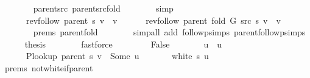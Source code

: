 \begin{isabellebody}
\ \ \ \ \ \ \isamarkupfalse%
\ parent{\isacharunderscore}{\kern0pt}src\ parent{\isacharunderscore}{\kern0pt}src{\isacharunderscore}{\kern0pt}fold\isanewline
\ \ \ \ \ \ \isamarkupfalse%
\ simp{\isacharplus}{\kern0pt}\isanewline
\ \ \ \ \isamarkupfalse%
\isanewline
\ \ \ \ \ \ {\isachardoublequoteopen}rev{\isacharunderscore}{\kern0pt}follow\ {\isacharparenleft}{\kern0pt}parent\ s{\isacharparenright}{\kern0pt}\ v\ {\isacharequal}{\kern0pt}\ {\isacharbrackleft}{\kern0pt}v{\isacharbrackright}{\kern0pt}{\isachardoublequoteclose}\isanewline
\ \ \ \ \ \ {\isachardoublequoteopen}rev{\isacharunderscore}{\kern0pt}follow\ {\isacharparenleft}{\kern0pt}parent\ {\isacharparenleft}{\kern0pt}fold\ G\ src\ s{\isacharparenright}{\kern0pt}{\isacharparenright}{\kern0pt}\ v\ {\isacharequal}{\kern0pt}\ {\isacharbrackleft}{\kern0pt}v{\isacharbrackright}{\kern0pt}{\isachardoublequoteclose}\isanewline
\ \ \ \ \ \ \isamarkupfalse%
\ {\isachardoublequoteopen}{}{\isachardot}{\kern0pt}prems{\isachardoublequoteclose}{\isacharparenleft}{\kern0pt}{}{\isacharparenright}{\kern0pt}\ parent{\isacharunderscore}{\kern0pt}fold\isanewline
\ \ \ \ \ \ \isamarkupfalse%
\ {\isacharparenleft}{\kern0pt}simp{\isacharunderscore}{\kern0pt}all\ add{\isacharcolon}{\kern0pt}\ follow{\isacharunderscore}{\kern0pt}psimps\ parent{\isachardot}{\kern0pt}follow{\isacharunderscore}{\kern0pt}psimps{\isacharparenright}{\kern0pt}\isanewline
\ \ \ \ \isamarkupfalse%
\ {\isacharquery}{\kern0pt}thesis\isanewline
\ \ \ \ \ \ \isamarkupfalse%
\ fastforce\isanewline
\ \ \isamarkupfalse%
\isanewline
\ \ \ \ \isamarkupfalse%
\ False\isanewline
\ \ \ \ \isamarkupfalse%
\ \isamarkupfalse%
\ u\ \ u{\isacharcolon}{\kern0pt}\isanewline
\ \ \ \ \ \ {\isachardoublequoteopen}P{\isacharunderscore}{\kern0pt}lookup\ {\isacharparenleft}{\kern0pt}parent\ s{\isacharparenright}{\kern0pt}\ v\ {\isacharequal}{\kern0pt}\ Some\ u{\isachardoublequoteclose}\isanewline
\ \ \ \ \ \ {\isachardoublequoteopen}{\isasymnot}\ white\ s\ u{\isachardoublequoteclose}\isanewline
\ \ \ \ \ \ \isamarkupfalse%
\ {\isachardoublequoteopen}{}{\isachardot}{\kern0pt}prems{\isachardoublequoteclose}{\isacharparenleft}{\kern0pt}{}{\isacharparenright}{\kern0pt}\ not{\isacharunderscore}{\kern0pt}white{\isacharunderscore}{\kern0pt}if{\isacharunderscore}{\kern0pt}parent\isanewline
\ \ \ \ \ \ \isamarkupfalse%

\end{isabellebody}
